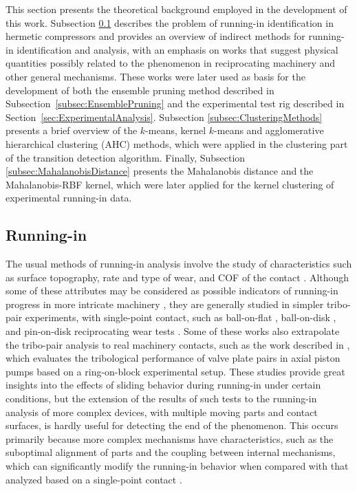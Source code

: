 \documentclass[preprint,11pt,number]{elsarticle}
\begin{document}

This section presents the theoretical background employed in the development of this work. Subsection \ref{subsec:RunningIn} describes the problem of running-in identification in hermetic compressors and provides an overview of indirect methods for running-in identification and analysis, with an emphasis on works that suggest physical quantities possibly related to the phenomenon in reciprocating machinery and other general mechanisms. These works were later used as basis for the development of both the ensemble pruning method described in Subsection~\ref{subsec:EnsemblePruning} and the experimental test rig described in Section~\ref{sec:ExperimentalAnalysis}. Subsection \ref{subsec:ClusteringMethods} presents a brief overview of the $k$-means, kernel $k$-means and agglomerative hierarchical clustering (AHC) methods, which were applied in the clustering part of the transition detection algorithm. Finally, Subsection \ref{subsec:MahalanobisDistance} presents the Mahalanobis distance and the Mahalanobis-RBF kernel, which were later applied for the kernel clustering of experimental running-in data.

\subsection{Running-in}\label{subsec:RunningIn}

The usual methods of running-in analysis involve the study of characteristics such as surface topography, rate and type of wear, and COF of the contact \cite{Khonsari2021,Blau1982}. \color{red} Although some of these attributes may be considered as possible indicators of running-in progress in more intricate machinery \cite{Ruggiero2020}, they are generally studied in simpler tribo-pair experiments, with single-point contact, such as ball-on-flat \cite{Blau1981}, ball-on-disk \cite{Grutzmacher2018}, and pin-on-disk reciprocating wear tests \cite{Lin2024,Zambrano2024,Ghatrehsamani2022}. Some of these works also extrapolate the tribo-pair analysis to real machinery contacts, such as the work described in \cite{Jiao2023}, which evaluates the tribological performance of valve plate pairs in axial piston pumps based on a ring-on-block experimental setup. \color{black} These studies provide great insights into the effects of sliding behavior during running-in under certain conditions, but the extension of the results of such tests to the running-in analysis of more complex devices, with multiple moving parts and contact surfaces, is hardly useful for detecting the end of the phenomenon. This occurs primarily because more complex mechanisms have characteristics, such as the suboptimal alignment of parts and the coupling between internal mechanisms, which can significantly modify the running-in behavior when compared with that analyzed based on a single-point contact \cite{Blau1991}.
\end{document}
